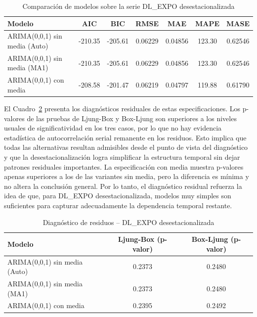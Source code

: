 \documentclass[11pt]{article}
\begin{document}
\begin{table}[H]
\centering
\caption{Comparación de modelos sobre la serie DL\_EXPO desestacionalizada}
\label{tab:modelos_sa_expo}
\begin{tabular}{lcccccc}
\hline
Modelo & AIC & BIC & RMSE & MAE & MAPE & MASE \\
\hline
ARIMA(0,0,1) sin media (Auto) & -210.35 & -205.61 & 0.06229 & 0.04856 & 123.30 & 0.62546 \\
ARIMA(0,0,1) sin media (MA1)  & -210.35 & -205.61 & 0.06229 & 0.04856 & 123.30 & 0.62546 \\
ARIMA(0,0,1) con media        & -208.58 & -201.47 & 0.06219 & 0.04797 & 119.88 & 0.61790 \\
\hline
\end{tabular}
\end{table}

El Cuadro~\ref{tab:diag_sa_expo} presenta los diagnósticos residuales de estas especificaciones. Los p-valores de las pruebas de Ljung-Box y Box-Ljung son superiores a los niveles usuales de significatividad en los tres casos, por lo que no hay evidencia estadística de autocorrelación serial remanente en los residuos. Esto implica que todas las alternativas resultan admisibles desde el punto de vista del diagnóstico y que la desestacionalización logra simplificar la estructura temporal sin dejar patrones residuales importantes. La especificación con media muestra p-valores apenas superiores a los de las variantes sin media, pero la diferencia es mínima y no altera la conclusión general. Por lo tanto, el diagnóstico residual refuerza la idea de que, para DL\_EXPO desestacionalizada, modelos muy simples son suficientes para capturar adecuadamente la dependencia temporal restante.

\begin{table}[H]
\centering
\caption{Diagnóstico de residuos – DL\_EXPO desestacionalizada}
\label{tab:diag_sa_expo}
\begin{tabular}{lcc}
\hline
Modelo & Ljung-Box (p-valor) & Box-Ljung (p-valor) \\
\hline
ARIMA(0,0,1) sin media (Auto) & 0.2373 & 0.2480 \\
ARIMA(0,0,1) sin media (MA1)  & 0.2373 & 0.2480 \\
ARIMA(0,0,1) con media        & 0.2395 & 0.2492 \\
\hline
\end{tabular}
\end{table}
\end{document}
